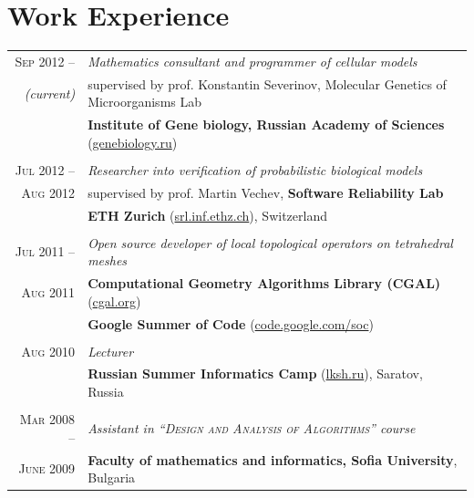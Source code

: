 \documentclass[a4paper,10pt]{article}
\def\myline{\color{linegray}\vline}
\begin{document}
{%
\section{Work Experience}
\hspace{0mm}\begin{tabular}{r!{\myline}p{14cm}}
	\textsc{Sep 2012 --}      &  \textit{Mathematics consultant and programmer of cellular models}\\
        \small\textit{(current)}  &  supervised by prof. Konstantin Severinov, Molecular Genetics of Microorganisms Lab\\
                                  &  \textbf{Institute of Gene biology, Russian Academy of Sciences} (\href{http://www.genebiology.ru/}{genebiology.ru})\\
	
        \\
	\textsc{Jul 2012 --}      &  \textit{Researcher into verification of probabilistic biological models}\\
        \textsc{Aug 2012} &  supervised by prof. Martin Vechev, \textbf{Software Reliability Lab}\\
                                  &  \textbf{ETH Zurich} (\href{http://www.srl.inf.ethz.ch/}{srl.inf.ethz.ch}), Switzerland\\
	
        \\
	\textsc{Jul 2011 --}      &  \textit{Open source developer of local topological operators on tetrahedral meshes}\\
	\textsc{Aug 2011}         &  \textbf{Computational Geometry Algorithms Library (CGAL)} (\href{http://www.cgal.org/}{cgal.org})\\
                                  &  \textbf{Google Summer of Code} (\href{http://code.google.com/soc/}{code.google.com/soc})\\
	
        \\
	\textsc{Aug 2010}         &  \textit{Lecturer}\\
	                          &  \textbf{Russian Summer Informatics Camp} (\href{http://lksh.ru/}{lksh.ru}), Saratov, Russia\vspace{-5mm}\\
	
	\\
	\textsc{Mar 2008 --}      &  \textit{Assistant in \textsc{``Design and Analysis of Algorithms''} course}\\
	\textsc{June 2009}        &  \textbf{Faculty of mathematics and informatics, Sofia University}, Bulgaria\\


\end{tabular}}
\end{document}
